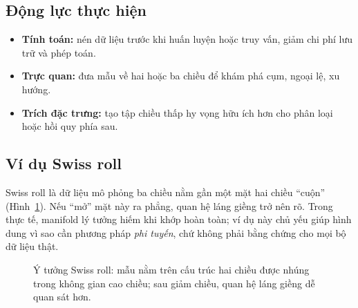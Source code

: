 \subsection{Động lực thực hiện}

\begin{itemize}
  \item \textbf{Tính toán:} nén dữ liệu trước khi huấn luyện hoặc truy vấn, giảm chi phí lưu trữ và phép toán.
  \item \textbf{Trực quan:} đưa mẫu về hai hoặc ba chiều để khám phá cụm, ngoại lệ, xu hướng.
  \item \textbf{Trích đặc trưng:} tạo tập chiều thấp hy vọng hữu ích hơn cho phân loại hoặc hồi quy phía sau.
\end{itemize}

\subsection{Ví dụ Swiss roll}

Swiss roll là dữ liệu mô phỏng ba chiều nằm gần một mặt hai chiều ``cuộn'' (Hình~\ref{fig:swiss-roll}). Nếu ``mở'' mặt này ra phẳng, quan hệ láng giềng trở nên rõ. Trong thực tế, manifold lý tưởng hiếm khi khớp hoàn toàn; ví dụ này chủ yếu giúp hình dung vì sao cần phương pháp \emph{phi tuyến}, chứ không phải bằng chứng cho mọi bộ dữ liệu thật.

\begin{figure}[H]
\centering
{}
\caption{Ý tưởng Swiss roll: mẫu nằm trên cấu trúc hai chiều được nhúng trong không gian cao chiều; sau giảm chiều, quan hệ láng giềng dễ quan sát hơn.}
\label{fig:swiss-roll}
\end{figure}

